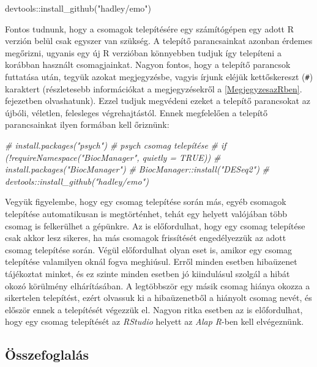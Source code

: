 \documentclass[
]{book}
\newenvironment{Shaded}{\begin{snugshade}}{\end{snugshade}}
\newcommand{\CommentTok}[1]{\textcolor[rgb]{0.56,0.35,0.01}{\textit{#1}}}
\newcommand{\FunctionTok}[1]{\textcolor[rgb]{0.00,0.00,0.00}{#1}}
\newcommand{\NormalTok}[1]{#1}
\newcommand{\SpecialCharTok}[1]{\textcolor[rgb]{0.00,0.00,0.00}{#1}}
\newcommand{\StringTok}[1]{\textcolor[rgb]{0.31,0.60,0.02}{#1}}
\begin{document}
\begin{Shaded}
\begin{Highlighting}[]
\NormalTok{devtools}\SpecialCharTok{::}\FunctionTok{install\_github}\NormalTok{(}\StringTok{"hadley/emo"}\NormalTok{)}
\end{Highlighting}
\end{Shaded}

Fontos tudnunk, hogy a csomagok telepítésére egy számítógépen egy adott R verzión belül csak egyszer van szükség. A telepítő parancsainkat azonban érdemes megőrizni, ugyanis egy új R verzióban könnyebben tudjuk így telepíteni a korábban használt csomagjainkat. Nagyon fontos, hogy a telepítő parancsok futtatása után, tegyük azokat megjegyzésbe, vagyis írjunk eléjük kettőskereszt (\texttt{\#}) karaktert (részletesebb információkat a megjegyzésekről a \ref{MegjegyzesazRben}. fejezetben olvashatunk). Ezzel tudjuk megvédeni ezeket a telepítő parancsokat az újbóli, véletlen, felesleges végrehajtástól. Ennek megfelelően a telepítő parancsainkat ilyen formában kell őriznünk:

\begin{Shaded}
\begin{Highlighting}[]
\CommentTok{\# install.packages("psych")        \# psych csomag telepítése}
\CommentTok{\# if (!requireNamespace("BiocManager", quietly = TRUE))}
\CommentTok{\#     install.packages("BiocManager")}
\CommentTok{\# BiocManager::install("DESeq2")}
\CommentTok{\# devtools::install\_github("hadley/emo")}
\end{Highlighting}
\end{Shaded}

Vegyük figyelembe, hogy egy csomag telepítése során más, egyéb csomagok telepítése automatikusan is megtörténhet, tehát egy helyett valójában több csomag is felkerülhet a gépünkre. Az is előfordulhat, hogy egy csomag telepítése csak akkor lesz sikeres, ha más csomagok frissítését engedélyezzük az adott csomag telepítése során. Végül előfordulhat olyan eset is, amikor egy csomag telepítése valamilyen oknál fogva meghiúsul. Erről minden esetben hibaüzenet tájékoztat minket, és ez szinte minden esetben jó kiindulásul szolgál a hibát okozó körülmény elhárításában. A legtöbbször egy másik csomag hiánya okozza a sikertelen telepítést, ezért olvassuk ki a hibaüzenetből a hiányolt csomag nevét, és először ennek a telepítését végezzük el. Nagyon ritka esetben az is előfordulhat, hogy egy csomag telepítését az \emph{RStudio} helyett az \emph{Alap R}-ben kell elvégeznünk.

\hypertarget{az-r-telepitese-1-summary}{%
\subsection{Összefoglalás}\label{az-r-telepitese-1-summary}}
\end{document}
